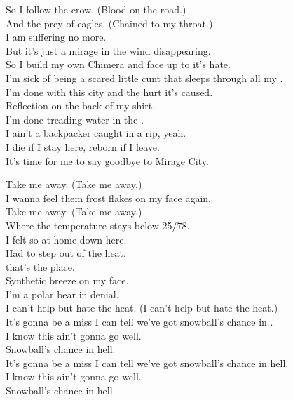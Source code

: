 So I follow the crow. (Blood on the road.) \\
And the prey of eagles. (Chained to my throat.) \\
I am suffering no more. \\
But it's just a mirage in the wind disappearing. \\

So I build my own Chimera and face up to it's hate. \\
I'm sick of being a scared little cunt that sleeps through all my . \\
I'm done with this city and the hurt it's caused. \\
Reflection on the back of my shirt. \\
I'm done treading water in the . \\
I ain't a backpacker caught in a rip, yeah. \\
I die if I stay here, reborn if I leave. \\
It's time for me to say goodbye to Mirage City. \\



Take me away. (Take me away.) \\
I wanna feel them frost flakes on my face again. \\
Take me away. (Take me away.) \\
Where the temperature stays below 25/78. \\

I felt so at home down here. \\
Had to step out of the heat. \\
 that's the place. \\
Synthetic breeze on my face. \\
I'm a polar bear in denial. \\
I can't help but hate the heat. (I can't help but hate the heat.) \\

It's gonna be a miss I can tell we've got snowball's chance in . \\
I know this ain't gonna go well. \\
Snowball's chance in hell. \\
It's gonna be a miss I can tell we've got snowball's chance in hell. \\
I know this ain't gonna go well. \\
Snowball's chance in hell. \\

